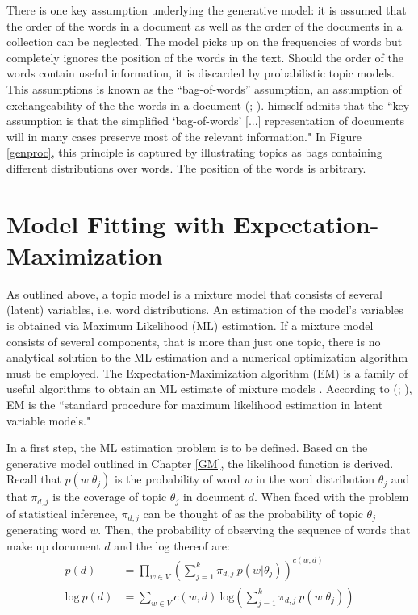 \documentclass[11pt,a4paper,english,oneside]{book}
\numberwithin{equation}{chapter}
\begin{document}
There is one key assumption underlying the generative model: it is assumed that the order of the words in a document as well as the order of the documents in a collection can be neglected. The model picks up on the frequencies of words but completely ignores the position of the words in the text. Should the order of the words contain useful information, it is discarded by probabilistic topic models. This assumptions is known as the “bag-of-words” assumption, an assumption of exchangeability of the the words in a document (\citealt[p.~994]{Blei.2003}; \citealt[~p. 3]{Steyvers(2007)}). \citet[~p. 290]{Hofmann.1999} himself admits that the ``key assumption is that the simplified `bag-of-words' [...] representation of documents will in many cases preserve most of the relevant information." In Figure \ref{genproc}, this principle is captured by illustrating topics as bags containing different distributions over words. The position of the words is arbitrary.
 
\section{Model Fitting with Expectation-Maximization}\label{Ch:model}

As outlined above, a topic model is a mixture model that consists of several (latent) variables, i.e. word distributions. An estimation of the model's variables is obtained via Maximum Likelihood (ML) estimation. If a mixture model consists of several components, that is more than just one topic, there is no analytical solution to the ML estimation and a numerical optimization algorithm must be employed. The Expectation-Maximization algorithm (EM) is a family of useful algorithms to obtain an ML estimate of mixture models \cite[~p. 359]{Zhai.2016}. According to \citeauthor{Hofmann.1999} (\citeyear[p. 290]{Hofmann.1999}; \citeyear[p. 181]{Hofmann.2001}), EM is the ``standard procedure for maximum likelihood estimation in latent variable models." 

In a first step, the ML estimation problem is to be defined. Based on the generative model outlined in Chapter \ref{GM}, the likelihood function is derived. Recall that $p(w | \theta_j)$ is the probability of word $w$ in the word distribution $\theta_j$ and that $\pi_{d,j}$ is the coverage of topic $\theta_j$ in document $d$. When faced with the problem of statistical inference, $\pi_{d,j}$ can be thought of as the probability of topic $\theta_j$ generating word $w$. Then, the probability of observing the sequence of words that make up document $d$ and the log thereof are:
\begin{align}
\label{prob} p(d) &= \underset{w \in V}\prod \left( \sum_{j=1}^{k}\pi_{d,j} \ p(w|\theta_j) \right)^{c(w,d)}\\
\label{log} \text{log} \ p(d) &= \underset{w \in V}\sum c(w,d) \ \text{log} \left( \sum_{j=1}^{k}\pi_{d,j} \ p(w|\theta_j) \right)
\end{align}
\end{document}

